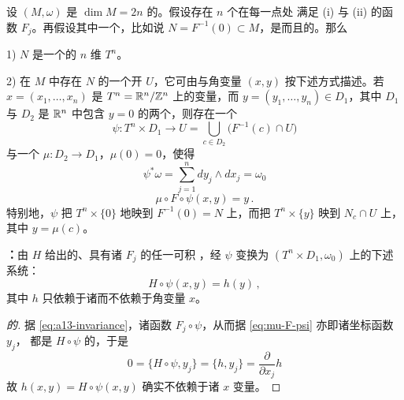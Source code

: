 \begin{theorem}[\trArnold-\trJost]\label{thm:arnold-jost}
设 $(M,\omega)$ 是 $\dim M=2n$ 的\trSymplecticManifold。假设存在 $n$ 个在每一点处%
满足 (i) 与 (ii) 的函数 $F_{j}$。再假设其中一个\trLevelSet，比如说%
$N=F^{-1}(0)\subset M$，是\trCompact{}而且\trConnected{}的。那么

1) $N$ 是一个\trEmbedding{}的 $n$ 维\trTorus{} $T^{n}$。

2) 在 $M$ 中存在 $N$ 的一个开\trNeighborhood{} $U$，它可由\trAction{}与角变量%
$(x,y)$ 按下述方式描述。若 $x=(x_{1},\dots,x_{n})$ 是\trTorus{}%
$T^{n}=\mathbb{R}^{n}/\mathbb{Z}^{n}$ 上的变量，而 $y=(y_{1},\dots,y_{n})\in D_{1}$，其中 $D_{1}$%
与 $D_{2}$ 是 $\mathbb{R}^{n}$ 中包含 $y=0$ 的两个\trDomain，则存在一个\trDiffeomorphism
\[
\psi:T^{n}\times D_{1}\longrightarrow U=\bigcup_{c\in D_{2}}\bigl(F^{-1}(c)\cap U\bigr)
\]
与一个\trDiffeomorphism{} $\mu:D_{2}\to D_{1}$，$\mu(0)=0$，使得
\begin{equation}\label{eq:psi-star-omega}
\psi^{*}\omega=\sum_{j=1}^{n}dy_{j}\wedge dx_{j}=\omega_{0}
\end{equation}
\begin{equation}\label{eq:mu-F-psi}
\mu\circ F\circ\psi(x,y)=y\,.
\end{equation}
特别地，$\psi$ 把\trTorus{} $T^{n}\times\{0\}$ \trDiffeomorphism{}地映到%
$F^{-1}(0)=N$ 上，而把\trTorus{} $T^{n}\times\{y\}$ 映到 $N_{c}\cap U$ 上，%
其中 $y=\mu(c)$。
\end{theorem}

\textbf{\trhCorollary：}\quad 由 $H$ 给出的、具有诸\trFirstIntegral{} $F_{j}$ 的任一可积%
\trHamiltonianSystem，经\trSymplecticDiffeomorphism{} $\psi$ 变换为%
$(T^{n}\times D_{1},\omega_{0})$ 上的下述系统：
\begin{equation}\label{eq:h-of-psi}
H\circ\psi(x,y)=h(y)\,,
\end{equation}
其中\trHamiltonianFunction{} $h$ 只依赖于诸\trFirstIntegral{}而不依赖于角变量 $x$。

\begin{proof}[\trhCorollary{}的\trhProof]
据 \eqref{eq:a13-invariance}，诸函数 $F_{j}\circ\psi$，从而据 \eqref{eq:mu-F-psi}%
亦即诸坐标函数 $y_{j}$，%
都是 $H\circ\psi$ 的\trFirstIntegral，于是
\[
0=\{H\circ\psi,y_{j}\}=\{h,y_{j}\}=\frac{\partial}{\partial x_{j}}h
\]
故 $h(x,y)=H\circ\psi(x,y)$ 确实不依赖于诸 $x$ 变量。
\end{proof}

